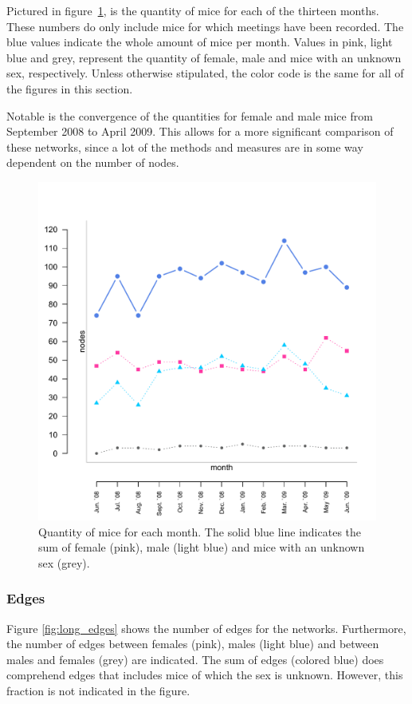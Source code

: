 Pictured in figure~\ref{fig:long_node}, is the quantity of mice for each of the thirteen months. These numbers do only include mice for which meetings have been recorded. The blue values indicate the whole amount of mice per month. Values in pink, light blue and grey, represent the quantity of female, male and mice with an unknown sex, respectively. Unless otherwise stipulated, the color code is the same for all of the figures in this section.

Notable is the convergence of the quantities for female and male mice from September 2008 to April 2009. This allows for a more significant comparison of these networks, since a lot of the methods and measures are in some way dependent on the number of nodes.  

\begin{figure}[htpb]
\begin{center}
  \includegraphics[width=.6\textwidth]{assets/pdf/long_nodes.pdf}
  \caption[Number of mice over the months]{Quantity of mice for each month. The solid blue line indicates the sum of female (pink), male (light blue) and mice with an unknown sex (grey).}
  \label{fig:long_node}
\end{center}
\end{figure}

\clearpage

\subsubsection{Edges}

Figure \ref{fig:long_edges} shows the number of edges for the networks. Furthermore, the number of edges between females (pink), males (light blue) and between males and females (grey) are indicated. The sum of edges (colored blue) does comprehend edges that includes mice of which the sex is unknown. However, this fraction is not indicated in the figure.

